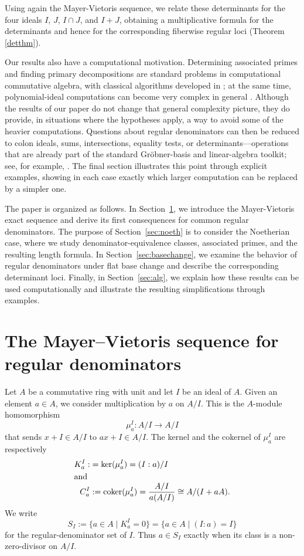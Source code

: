 \documentclass[11pt,leqno]{amsart}
\newcommand{\kker}{\operatorname{ker}}
\theoremstyle{definition}
\numberwithin{equation}{section}
\begin{document}
Using again the Mayer-Vietoris sequence, we relate these determinants for the four ideals $I$, $J$, $I\cap J$, and $I+J$, obtaining a multiplicative formula for the determinants and hence for the corresponding fiberwise regular loci (Theorem \ref{detthm}).

Our results also have a computational motivation. Determining associated primes and finding primary decompositions are standard problems in computational commutative algebra, with classical algorithms developed in \cite{GTZ88,EHV92}; at the same time, polynomial-ideal computations can become very complex in general \cite{MM82}. Although the results of our paper do not change that general complexity picture, they do provide, in situations where the hypotheses apply, a way to avoid some of the heavier computations. Questions about regular denominators can then be reduced to colon ideals, sums, intersections, equality tests, or determinants---operations that are already part of the standard Gr\"obner-basis and linear-algebra toolkit; see, for example, \cite{GP08}. The final section illustrates this point through explicit examples, showing in each case exactly which larger computation can be replaced by a simpler one.

The paper is organized as follows. In Section~\ref{sec:mv},  we introduce the Mayer-Vietoris exact sequence and derive its first consequences for common regular denominators. The purpose of Section~\ref{sec:noeth} is to consider the Noetherian case, where we study denominator-equivalence classes, associated primes, and the resulting length formula. In Section~\ref{sec:basechange}, we examine the behavior of regular denominators under flat base change and describe the corresponding determinant loci. Finally, in Section~\ref{sec:alg}, we explain how these results can be used computationally and illustrate the resulting simplifications through examples.

\section{The Mayer--Vietoris sequence for regular denominators}\label{sec:mv}
Let $A$ be a commutative ring with unit and let $I$ be an ideal of $A$. Given an element $a\in A$, we consider multiplication by $a$ on $A/I$. This is the $A$-module homomorphism 
$$\mu_a^I\colon A/I \rightarrow A/I$$ 
that sends $x+I\in A/I$ to $ax+I\in A/I$. The kernel and the cokernel of $\mu_a^I$ are respectively 
\begin{align*}
K_a^I:&= \kker(\mu^I_a)=(I:a)/I	\\
\noalign{\hbox{and}}
C_a^I&:={\operatorname{coker}(\mu_a^I)=\frac{A/I}{a(A/I)}\cong A/(I+aA)}.
\end{align*}
We write
\[
S_I:=\{a\in A\mid K_a^I=0\}=\{a\in A\mid (I:a)=I\}
\]
for the regular-denominator set of $I$. Thus $a\in S_I$ exactly when its class is a non-zero-divisor on $A/I$.
\end{document}
